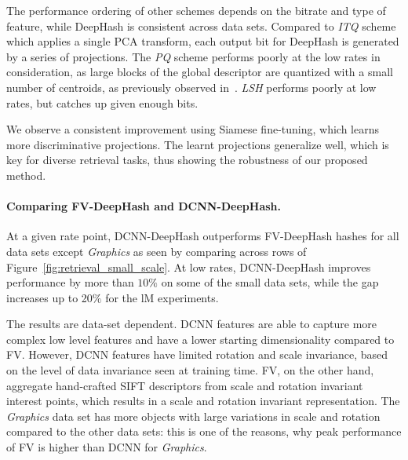 \documentclass[10pt,twocolumn,letterpaper]{article}
\begin{document}
The performance ordering of other schemes depends on the bitrate and type of feature, while DeepHash is consistent across data sets.
Compared to {\it ITQ} scheme which applies a single PCA transform, each output bit for DeepHash is generated by a series of projections. 
The {\it PQ} scheme performs poorly at the low rates in consideration, as large blocks of the global descriptor are quantized with a small number of centroids, as previously observed in~\cite{BPBC}.
{\it LSH} performs poorly at low rates, but catches up given enough bits. 

We observe a consistent improvement using Siamese fine-tuning, which learns more discriminative projections.
The learnt projections generalize well, which is key for diverse retrieval tasks, thus showing the robustness of our proposed method.

\vspace{-0.1em}
\paragraph{Comparing FV-DeepHash and DCNN-DeepHash.}
At a given rate point, DCNN-DeepHash outperforms FV-DeepHash hashes for all data sets except {\it Graphics} as seen by comparing across rows of Figure~\ref{fig:retrieval_small_scale}.
At low rates, DCNN-DeepHash improves performance by more than $10\%$ on some of the small data sets, while the gap increases up to 20$\%$  for the lM experiments. 

The results are data-set dependent. 
DCNN features are able to capture more complex low level features and have a lower starting dimensionality compared to FV. 
However, DCNN features have limited rotation and scale invariance, based on the level of data invariance seen at training time.
FV, on the other hand, aggregate hand-crafted SIFT descriptors from scale and rotation invariant interest points, which results in a scale and rotation invariant representation.
The {\it Graphics} data set has more objects with large variations in scale and rotation compared to the other data sets: this is one of the reasons, why peak performance of FV is higher than DCNN for {\it Graphics}.





\vspace{-0.1em}
\end{document}
